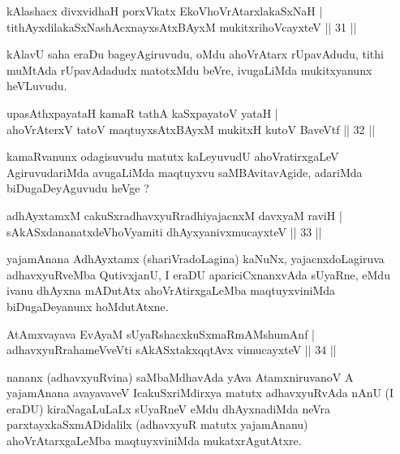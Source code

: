 \begin{shl}
kAlashacx divxvidhaH porxVkatx EkoV\s hoVrAtarxlakaSxNaH |\\
tithAyxdilakaSxNashAcxnayxsAtxBAyxM mukitxrihoVcayxteV \hfill || 31 ||
\end{shl}

\begin{artha}
kAlavU saha eraDu bageyAgiruvudu, oMdu ahoVrAtarx rUpavAdudu, tithi muMtAda rUpavAdadudx matotxMdu beVre, ivugaLiMda mukitxyanunx heVLuvudu.
\end{artha}


\begin{shl}
upasAthxpayataH kamaR tathA kaSxpayatoV yataH |\\
ahoVrAterxV tatoV maqtuyxsAtxBAyxM mukitxH kutoV BaveVtf \hfill || 32 ||
\end{shl}

\begin{artha}
kamaRvanunx odagisuvudu matutx kaLeyuvudU ahoVratirxgaLeV AgiruvudariMda avugaLiMda maqtuyxvu saMBAvitavAgide, adariMda biDugaDeyAguvudu heVge ?
\end{artha}


\begin{shl}
adhAyxtamxM cakuSxradhavxyuRradhiyajacnxM davxyaM raviH |\\
sAkASxdananatxdeVhoV\s yamiti dhAyxyanivxmucayxteV \hfill || 33 ||
\end{shl}

\begin{artha}
yajamAnana AdhAyxtamx (shariVradoLagina) kaNuNx, yajacnxdoLagiruva adhavxyuR\-veMba QutivxjanU, I eraDU apariciCxnanxvAda sUyaRne, eMdu ivanu dhAyxna mADutAtx ahoVrAtirxgaLeMba maqtuyxviniMda biDugaDeyanunx hoMdutAtxne.
\end{artha}


\begin{shl}
AtAmxvayava EvAyaM sUyaRshacxkuSxmaRmAMshumAnf |\\
adhavxyuRrahameVveVti sAkASxtakxqqtAvx vimucayxteV \hfill || 34 ||
\end{shl}

\begin{artha}
nananx (adhavxyuRvina) saMbaMdhavAda yAva AtamxniruvanoV A yajamAnana avayavaveV IcakuSxriMdirxya matutx adhavxyuRvAda nAnU (I eraDU) kiraNagaLuLaLx sUyaRneV eMdu dhAyxnadiMda neVra parxtayxkaSxmADidalilx (adhavxyuR matutx yajamAnanu) ahoVrAtarxgaLeMba maqtuyxviniMda mukatxrAgutAtxre.
\end{artha}

